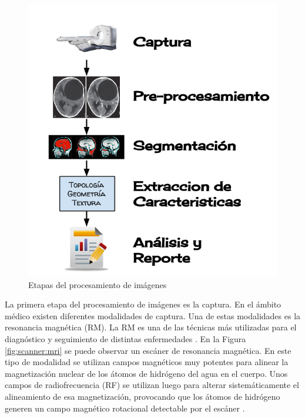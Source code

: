 \begin{figure}[h!]
\centering
\includegraphics[scale=0.3]{images/procesamiento.png}
\caption{Etapas del procesamiento de imágenes}
\label{fig:etapas_del_procesamiento}
\end{figure}

La primera etapa del procesamiento de imágenes es la captura. En el ámbito médico existen diferentes modalidades de captura. Una de estas modalidades es la resonancia magnética (RM). La RM es una de las técnicas más utilizadas para el diagnóstico y seguimiento de distintas enfermedades \citep{prince2006medical}. En la Figura \ref{fig:scanner:mri} se puede observar un escáner de resonancia magnética.  En este tipo de modalidad se utilizan campos magnéticos muy potentes para alinear la magnetización nuclear de los átomos  de hidrógeno del agua en el cuerpo. Unos campos de radiofrecuencia (RF) se utilizan luego para alterar sistemáticamente el alineamiento de esa magnetización, provocando que los átomos de hidrógeno generen un campo magnético rotacional detectable por el escáner \citep{novelline2004squire}.

